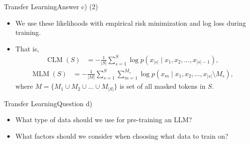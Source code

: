 \documentclass[t]{beamer}
\newcommand\op[1]{\operatorname{#1}}
\begin{document}
\begin{frame}{Transfer Learning}{Answer c) (2)}
    \begin{itemize}
        \item We use these likelihoods with empirical risk minimization and log
              loss during training.
        \item That is,
              \begin{align}
                  \op{CLM}(S) & = - \frac{1}{|S|} \sum_{s=1}^{S} \log p(x_{|s|} \mid x_1, x_2, \ldots, x_{|s|-1}),
              \end{align}
              \begin{align}
                  \op{MLM}(S) & = - \frac{1}{|M|} \sum_{s=1}^{S} \sum_{m=1}^{M_s} \log p(x_m \mid x_1, x_2, \ldots, x_{|s|} \setminus M_s),
              \end{align}
              where $M = \{M_1 \cup M_2 \cup \ldots \cup M_{|S|}\}$ is set of
              all masked tokens in $S$.
    \end{itemize}
\end{frame}

\begin{frame}{Transfer Learning}{Question d)}
    \begin{itemize}
        \item What type of data should we use for pre-training an LLM?
        \item What factors should we consider when choosing what data to train
              on?
    \end{itemize}
\end{frame}
\end{document}
